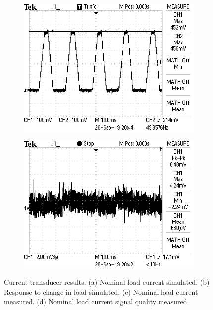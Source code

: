 \begin{figure} [!ht]
\begin{subfigure}[]{0.4\textwidth}
              \centering
  		\includegraphics[width=1\linewidth]{./Figures/itrans_meas_nom.JPG}
		    \caption{} \label{subfig:itrans_meas_nom}
     \end{subfigure}
          \begin{subfigure}[]{0.4\textwidth}
             \centering
  		\includegraphics[width=1.0\linewidth]{./Figures/itrans_meas_noise.JPG}
		   \caption{ } \label{subfig:itrans_meas_noise}
     \end{subfigure}
     \caption[Current transducer measurement results]{Current transducer results. (a) Nominal load current simulated. (b) Response to change in load simulated. (c) Nominal load current measured. (d) Nominal load current signal quality measured.} \label{fig:itrans_results}
\end{figure}

